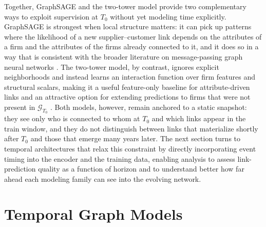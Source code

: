 Together, GraphSAGE and the two-tower model provide two complementary ways to exploit supervision at \(T_0\) without yet modeling time explicitly. GraphSAGE is strongest when local structure matters: it can pick up patterns where the likelihood of a new supplier--customer link depends on the attributes of a firm and the attributes of the firms already connected to it, and it does so in a way that is consistent with the broader literature on message-passing graph neural networks \parencite{hamilton_inductive_2017,hamilton_representation_2017,zhang_link_2018}. The two-tower model, by contrast, ignores explicit neighborhoods and instead learns an interaction function over firm features and structural scalars, making it a useful feature-only baseline for attribute-driven links and an attractive option for extending predictions to firms that were not present in \(\mathcal{G}_{T_0}\) \parencite{covington_deep_2016,he_neural_2017}. Both models, however, remain anchored to a static snapshot: they see only who is connected to whom at \(T_0\) and which links appear in the train window, and they do not distinguish between links that materialize shortly after \(T_0\) and those that emerge many years later. The next section turns to temporal architectures that relax this constraint by directly incorporating event timing into the encoder and the training data, enabling analysis to assess link-prediction quality as a function of horizon and to understand better how far ahead each modeling family can see into the evolving network.


\section{Temporal Graph Models}

